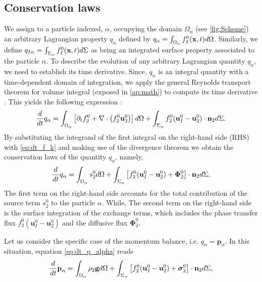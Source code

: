 \subsection{Conservation laws}

We assign to a particle indexed, $\alpha$, occupying the domain $\Omega_\alpha$ (see \ref{fig:Scheme}) an arbitrary Lagrangian property $q_\alpha$ defined by $q_\alpha  = \int_{\Omega_\alpha}  f_2^0(\textbf{x},t)  d\Omega$.
Similarly, we define $q_{I\alpha} = \int_{\Sigma_\alpha}  f_I^0(\textbf{x},t)  d\Sigma$ as being an integrated surface property associated to the particle $\alpha$.
To describe the evolution of any arbitrary Lagrangian quantity $q_\alpha$, we need to establish its time derivative.
Since, $q_\alpha$ is an integral quantity with a time-dependent domain of integration, we apply the general Reynolds transport theorem for volume integral (exposed in \ref{ap:math}) to compute its time derivative \citep{morel2015mathematical}.
This yields the following expression :
\begin{equation}
    \frac{d}{d t}  q_\alpha
    = \int_{\Omega_\alpha} \left[ \partial_t f_2^0 + \mathbf{\nabla}\cdot\left(f_2^0\textbf{u}_2^0\right) \right] d\Omega\\
    + \int_{\Sigma_\alpha}  f_2^0 (\textbf{u}_I^0-\textbf{u}_2^0)\cdot \textbf{n}_2  d\Sigma.
\end{equation}
By substituting the integrand of the first integral on the right-hand side (RHS) with \ref{eq:dt_f_k} and making use of the divergence theorem we obtain the conservation laws of the quantity $q_\alpha$, namely,  
\begin{equation}
    \frac{d}{d t}  q_\alpha
    = \int_{\Omega_\alpha}  s_2^0  d\Omega
    + \int_{\Sigma_\alpha}  \left[
        f_2^0 (\textbf{u}_I^0-\textbf{u}_2^0) 
        + \mathbf{\Phi}_2^0 
        \right] \cdot \textbf{n}_2  d\Sigma,
    \label{eq:dt_q_alpha}
\end{equation}
The first term on the right-hand side accounts for the total contribution of the source term $s_2^0$ to the particle $\alpha$.
While, The second term on the right-hand side is the surface integration of the exchange terms, which includes the phase transfer flux $f_2^0 (\textbf{u}_I^0-\textbf{u}_2^0)$ and the diffusive flux $\mathbf{\Phi}_2^0$. 


Let us consider the specific case of the momentum balance, i.e. $q_\alpha = \textbf{p}_\alpha$.
In this situation, equation \eqref{eq:dt_q_alpha} reads
\begin{equation}
    \ddt  \textbf{p}_\alpha
    = \intO{ \rho_2\textbf{g} }
    + \intS{ \left[
        f_2^0 (\textbf{u}_I^0-\textbf{u}_2^0)
        + \bm{\sigma}_2^0%
        \right] \cdot \textbf{n}_2 },
    \label{eq:dt_q_alpha}
\end{equation}

